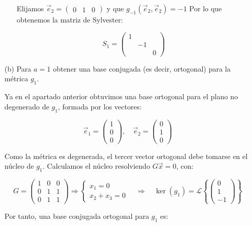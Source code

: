 \documentclass[12pt]{article}
\begin{document}
\begin{ejercicio}[4 puntos]
\begin{enumerate}
\begin{itemize}
				Elijamos \( \vec{e}_2 = \begin{pmatrix} 0 & 1 & 0 \end{pmatrix}\) y que \(g_{-1}(\vec{e}_2, \vec{e}_2) = -1\)
				Por lo que obtenemos la matriz de Sylvester:
				
				\[
				S_1 = \begin{pmatrix}
					1 &   &   \\
					& -1 &   \\
					&   & 0
				\end{pmatrix}
				\]
				
			\end{itemize}
			
			\item[(b)] Para $a = 1$ obtener una base conjugada (es decir, ortogonal) para la métrica $g_1$.
			
			Ya en el apartado anterior obtuvimos una base ortogonal para el plano no degenerado de \( g_1 \), formada por los vectores:
			
			\[
			\vec{e}_1 = \begin{pmatrix} 1 \\ 0 \\ 0 \end{pmatrix}, \quad
			\vec{e}_2 = \begin{pmatrix} 0 \\ 1 \\ 0 \end{pmatrix}
			\]
			
			Como la métrica es degenerada, el tercer vector ortogonal debe tomarse en el núcleo de \( g_1 \). Calculamos el núcleo resolviendo \( G \vec{x} = 0 \), con:
			
			\[
			G = 
			\begin{pmatrix}
				1 & 0 & 0 \\
				0 & 1 & 1 \\
				0 & 1 & 1
			\end{pmatrix}
			\Rightarrow
			\left\{
			\begin{array}{l}
				x_1 = 0 \\
				x_2 + x_3 = 0
			\end{array}
			\right.
			\quad \Rightarrow \quad
			\ker(g_1) = \mathcal{L} \left\lbrace \begin{pmatrix} 0 \\ 1 \\ -1 \end{pmatrix} \right\rbrace
			\]
			
			Por tanto, una base conjugada ortogonal para \( g_1 \) es:
			

\end{enumerate}
\end{ejercicio}
\end{document}
